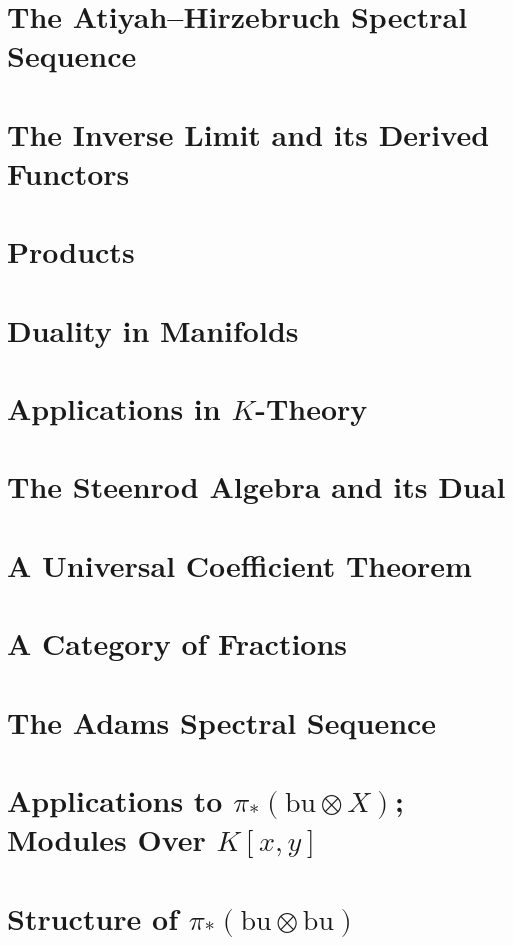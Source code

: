 \documentclass[english, oneside, letterpaper]{book}
\newcommand{\bu}{\mathrm{bu}}
\newcommand{\nnt}{\otimes}
\newcommand{\nntunicode}[2]{}
\newcommand{\maybeprintindex}{\printindex}
\begin{document}
\section{The Atiyah--Hirzebruch Spectral Sequence}\label{sec:part-3-sec-7}
\section{The Inverse Limit and its Derived Functors}\label{sec:part-3-sec-8}
\section{Products}\label{sec:part-3-sec-9}
\section{Duality in Manifolds}\label{sec:part-3-sec-10}
\section{Applications in \texorpdfstring{$K$}{K}-Theory}\label{sec:part-3-sec-11}
\section{The Steenrod Algebra and its Dual}\label{sec:part-3-sec-12}
\section{A Universal Coefficient Theorem}\label{sec:part-3-sec-13}
\section{A Category of Fractions}\label{sec:part-3-sec-14}
\section{The Adams Spectral Sequence}\label{sec:part-3-sec-15}
\section{Applications to $\pi_*(\bu\nnt X)$; Modules Over \texorpdfstring{$K[x,y]$}{K[x,y]}}\label{sec:part-3-sec-16}
\section{Structure of \texorpdfstring{$\pi_*(\bu\nnt\bu)$}{π_*(bu\nntunicode bu)}}\label{sec:part-3-sec-17}
\maybeprintindex
\end{document}
